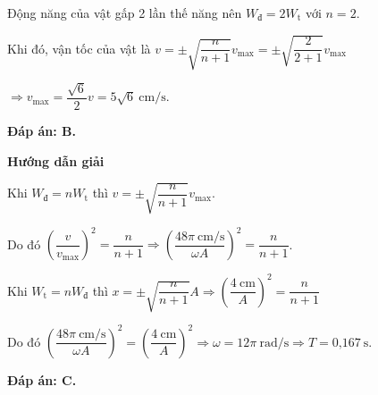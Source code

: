 \begin{dang}
{		Động năng của vật gấp 2 lần thế năng nên $W_{\text {đ}}=2W_{\text {t}}$ với $n=2$.
		
		Khi đó, vận tốc của vật là $v=\pm \sqrt{\dfrac{n}{n+1}}v_\text{max}=\pm \sqrt{\dfrac{2}{2+1}}v_\text{max}$
		
		$\Rightarrow v_\text{max}= \dfrac{\sqrt{6}}{2}v=5\sqrt{6}\ \text{cm/s}$.
		
		\textbf{Đáp án: B.}
	}
	{\begin{center}
			\textbf{Hướng dẫn giải}
		\end{center}
		
		Khi $W_{\text {đ}}=nW_{\text {t}}$ thì  $v=\pm \sqrt{\dfrac{n}{n+1}}v_\text{max}$.
		
		Do đó $\left( \dfrac{v}{v_\text{max}} \right)^2=\dfrac{n}{n+1}\Rightarrow \left( \dfrac{\text{48}\pi\ \text{cm/s}}{\omega A} \right)^2=\dfrac{n}{n+1}$.
		
		Khi $W_{\text {t}}=nW_{\text {đ}}$ thì $x=\pm \sqrt{\dfrac{n}{n+1}}A\Rightarrow \left( \dfrac{\text{4}\ \text{cm}}{A} \right)^2=\dfrac{n}{n+1} $
		
		
		Do đó $\left( \dfrac{\text{48}\pi\ \text{cm/s}}{\omega A} \right)^2=\left( \dfrac{\text{4}\ \text{cm}}{A} \right)^2\Rightarrow \omega= 12\pi \ \text{rad/s}\Rightarrow T=\text{0,167}\ \text{s}$.
		
		\textbf{Đáp án: C.}
	}
\end{dang}
